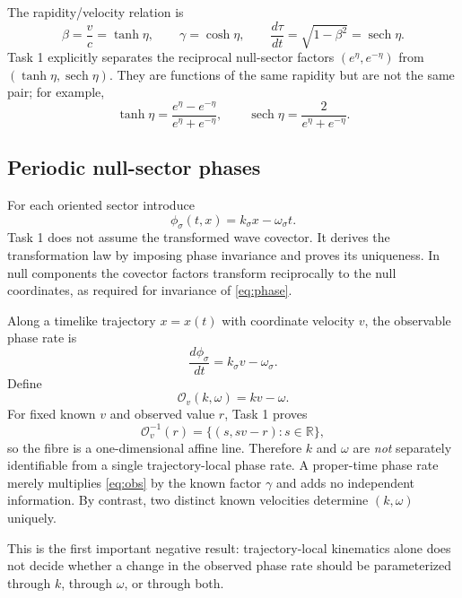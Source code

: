 \documentclass[11pt,a4paper]{article}
\newcommand{\R}{\mathbb{R}}
\newcommand{\sech}{\operatorname{sech}}
\begin{document}
The rapidity/velocity relation is
\begin{equation}
 \beta=\frac vc=\tanh\eta,
 \qquad
 \gamma=\cosh\eta,
 \qquad
 \frac{d\tau}{dt}=\sqrt{1-\beta^2}=\sech\eta.
\label{eq:properrate}
\end{equation}
Task 1 explicitly separates the reciprocal null-sector factors $(e^{\eta},e^{-\eta})$ from $(\tanh\eta,\sech\eta)$.  They are functions of the same rapidity but are not the same pair; for example,
\begin{equation}
 \tanh\eta=\frac{e^{\eta}-e^{-\eta}}{e^{\eta}+e^{-\eta}},
 \qquad
 \sech\eta=\frac{2}{e^{\eta}+e^{-\eta}}.
\end{equation}

\subsection{Periodic null-sector phases}

For each oriented sector introduce
\begin{equation}
 \phi_\sigma(t,x)=k_\sigma x-\omega_\sigma t.
\label{eq:phase}
\end{equation}
Task 1 does not assume the transformed wave covector.  It derives the transformation law by imposing phase invariance and proves its uniqueness.  In null components the covector factors transform reciprocally to the null coordinates, as required for invariance of \eqref{eq:phase}.

Along a timelike trajectory $x=x(t)$ with coordinate velocity $v$, the observable phase rate is
\begin{equation}
 \frac{d\phi_\sigma}{dt}=k_\sigma v-\omega_\sigma.
\label{eq:obs}
\end{equation}
Define
\begin{equation}
 \mathcal O_v(k,\omega)=kv-\omega.
\end{equation}
For fixed known $v$ and observed value $r$, Task 1 proves
\begin{equation}
 \mathcal O_v^{-1}(r)
 =\{(s,sv-r):s\in\R\},
\label{eq:fibre}
\end{equation}
so the fibre is a one-dimensional affine line.  Therefore $k$ and $\omega$ are \emph{not} separately identifiable from a single trajectory-local phase rate.  A proper-time phase rate merely multiplies \eqref{eq:obs} by the known factor $\gamma$ and adds no independent information.  By contrast, two distinct known velocities determine $(k,\omega)$ uniquely.

This is the first important negative result: trajectory-local kinematics alone does not decide whether a change in the observed phase rate should be parameterized through $k$, through $\omega$, or through both.
\end{document}
